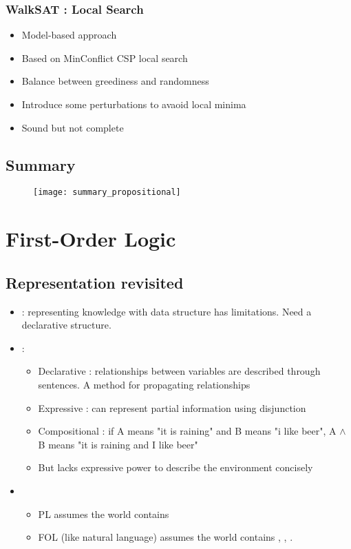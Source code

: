 \subsubsection{WalkSAT : Local Search}

\begin{itemize}
\item Model-based approach
\item Based on MinConflict CSP local search
\item Balance between greediness and randomness
\item Introduce some perturbations to avaoid local minima
\item Sound but not complete
\end{itemize}

\subsection{Summary}

\begin{figure}[H]
    \centering
    \texttt{[image: summary\_propositional]}
\end{figure}

\section{First-Order Logic}

\subsection{Representation revisited}

\begin{itemize}
\item {} : representing knowledge with data structure has limitations. Need a declarative structure.
\item {} :
	\begin{itemize}
	\item Declarative : relationships between variables are described through sentences. A method for propagating relationships
	\item Expressive : can represent partial information using disjunction
	\item Compositional : if A means "it is raining" and B means "i like beer", A $\land$ B means "it is raining and I like beer"
	\item But lacks expressive power to describe the environment concisely
	\end{itemize}
\item {}
	\begin{itemize}
	\item PL assumes the world contains 
	\item FOL (like natural language) assumes the world contains , , .
	\end{itemize}
\end{itemize}

